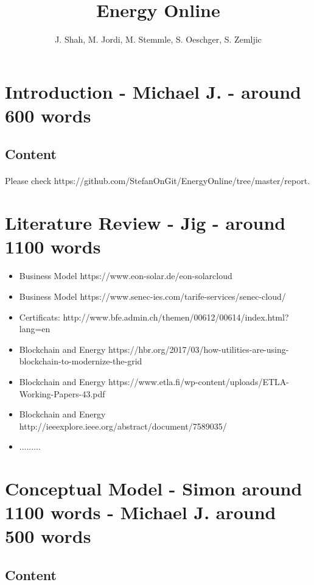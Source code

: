 \documentclass{scrartcl}
\begin{document}
	
	\title{Energy Online}
	\subtitle{}
	\author{J. Shah, M. Jordi, M. Stemmle, S. Oeschger, S. Zemljic}
	
	\maketitle
	\section{Introduction - Michael J. - around 600 words}
	\subsection{Content}
    \paragraph{}
    Please check https://github.com/StefanOnGit/EnergyOnline/tree/master/report.

	\section{Literature Review - Jig - around 1100 words}
    
    \begin{itemize}
    \item Business Model https://www.eon-solar.de/eon-solarcloud
    \item Business Model https://www.senec-ies.com/tarife-services/senec-cloud/
    \item Certificats: http://www.bfe.admin.ch/themen/00612/00614/index.html?lang=en
    \item Blockchain and Energy https://hbr.org/2017/03/how-utilities-are-using-blockchain-to-modernize-the-grid
    \item Blockchain and Energy https://www.etla.fi/wp-content/uploads/ETLA-Working-Papers-43.pdf
    \item Blockchain and Energy http://ieeexplore.ieee.org/abstract/document/7589035/
    \item .........
    \end{itemize}
	
	\section{Conceptual Model - Simon around 1100 words - Michael J. around 500 words}
	\subsection{Content}
\end{document}
